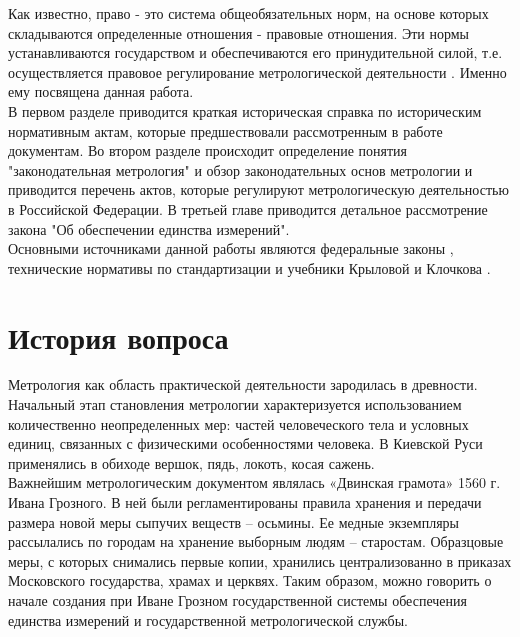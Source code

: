 \documentclass[14pt, a4paper] {ncc}
\begin{document}
       Как известно, право - это система общеобязательных норм, на основе которых
       складываются определенные отношения - правовые отношения. Эти нормы
       устанавливаются государством и обеспечиваются его принудительной силой,
       т.е. осуществляется правовое регулирование метрологической деятельности \cite{metrob2}.
	   Именно ему посвящена данная работа. \\

	   В первом разделе приводится краткая историческая справка по историческим нормативным
	   актам, которые предшествовали рассмотренным в работе документам. Во втором
	   разделе происходит определение понятия "законодательная метрология" и обзор
	   законодательных основ метрологии и приводится перечень актов, которые
	   регулируют метрологическую деятельностью в Российской Федерации. В третьей
	   главе приводится детальное рассмотрение закона "Об обеспечении единства измерений". \\

	   Основными источниками данной работы являются федеральные законы \cite{federal},
	   технические нормативы по стандартизации и  учебники 
	   Крыловой \cite{krilova} и Клочкова \cite{micromake}. %

\newpage
\section{История вопроса}

Метрология как область практической деятельности зародилась в
древности. Начальный этап становления метрологии характеризуется
использованием количественно неопределенных мер: частей человеческого
тела и условных единиц, связанных с физическими особенностями человека. В
Киевской Руси применялись в обиходе вершок, пядь, локоть, косая сажень.\\

Важнейшим метрологическим документом являлась «Двинская грамота» 1560
г. Ивана Грозного. В ней были регламентированы правила хранения и передачи
размера новой меры сыпучих веществ – осьмины. Ее медные экземпляры
рассылались по городам на хранение выборным людям – старостам. Образцовые
меры, с которых снимались первые копии, хранились централизованно в
приказах Московского государства, храмах и церквях. Таким образом, можно
говорить о начале создания при Иване Грозном государственной системы
обеспечения единства измерений и государственной метрологической службы.\\
\end{document}
